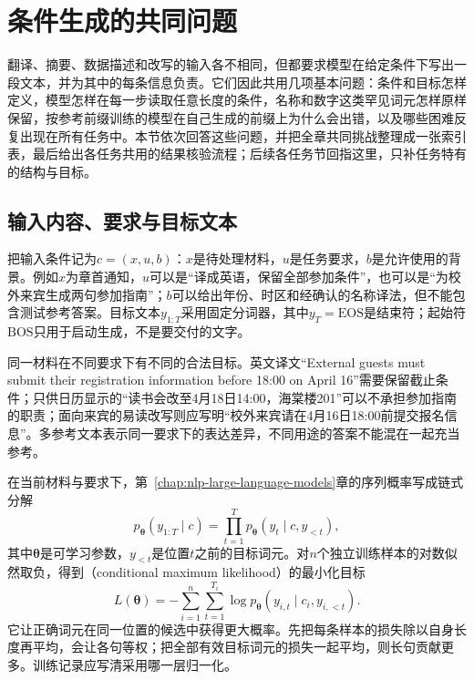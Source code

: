 \section{条件生成的共同问题}
\label{sec:nlp-generation-interface}

翻译、摘要、数据描述和改写的输入各不相同，但都要求模型在给定条件下写出一段文本，并为其中的每条信息负责。它们因此共用几项基本问题：条件和目标怎样定义，模型怎样在每一步读取任意长度的条件，名称和数字这类罕见词元怎样原样保留，按参考前缀训练的模型在自己生成的前缀上为什么会出错，以及哪些困难反复出现在所有任务中。本节依次回答这些问题，并把全章共同挑战整理成一张索引表，最后给出各任务共用的结果核验流程；后续各任务节回指这里，只补任务特有的结构与目标。

\subsection{输入内容、要求与目标文本}
\label{sec:nlp-generation-training}

把输入条件记为$c=(x,u,b)$：$x$是待处理材料，$u$是任务要求，$b$是允许使用的背景。例如$x$为章首通知，$u$可以是“译成英语，保留全部参加条件”，也可以是“为校外来宾生成两句参加指南”；$b$可以给出年份、时区和经确认的名称译法，但不能包含测试参考答案。目标文本$y_{1:T}$采用固定分词器，其中$y_T=\mathrm{EOS}$是结束符；起始符$\mathrm{BOS}$只用于启动生成，不是要交付的文字。

同一材料在不同要求下有不同的合法目标。英文译文“External guests must submit their registration information before 18:00 on April 16”需要保留截止条件；只供日历显示的“读书会改至4月18日14:00，海棠楼201”可以不承担参加指南的职责；面向来宾的易读改写则应写明“校外来宾请在4月16日18:00前提交报名信息”。多参考文本表示同一要求下的表达差异，不同用途的答案不能混在一起充当参考。

在当前材料与要求下，第~\ref{chap:nlp-large-language-models}章的序列概率写成链式分解
\begin{equation}
  p_{\bm{\theta}}(y_{1:T}\mid c)
  =\prod_{t=1}^{T}p_{\bm{\theta}}(y_t\mid c,y_{<t}),
  \label{eq:nlp-generation-factorization}
\end{equation}
其中$\bm{\theta}$是可学习参数，$y_{<t}$是位置$t$之前的目标词元。对$n$个独立训练样本的对数似然取负，得到（conditional maximum likelihood）的最小化目标
\begin{equation}
  L(\bm{\theta})
  =-\sum_{i=1}^{n}\sum_{t=1}^{T_i}
  \log p_{\bm{\theta}}(y_{i,t}\mid c_i,y_{i,<t}).
  \label{eq:nlp-generation-nll}
\end{equation}
它让正确词元在同一位置的候选中获得更大概率。先把每条样本的损失除以自身长度再平均，会让各句等权；把全部有效目标词元的损失一起平均，则长句贡献更多。训练记录应写清采用哪一层归一化。


